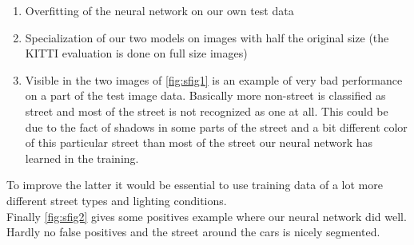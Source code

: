 \begin{enumerate}
    \item Overfitting of the neural network on our own test data
    \item Specialization of our two models on images with half the original
          size (the KITTI evaluation is done on full size images)
    \item Visible in the two images of \cref{fig:sfig1} is an example of very
          bad performance on a part of the test image data. Basically more
          non-street is classified as street and most of the street is not
          recognized as one at all. This could be due to the fact of shadows
          in some parts of the street and a bit different color of this
          particular street than most of the street our neural network has
          learned in the training.
\end{enumerate}
To improve the latter it would be essential to use training data of a lot more
different street types and lighting conditions.\\
Finally \cref{fig:sfig2} gives some positives example where our neural network
did well. Hardly no false positives and the street around the cars is nicely
segmented.


